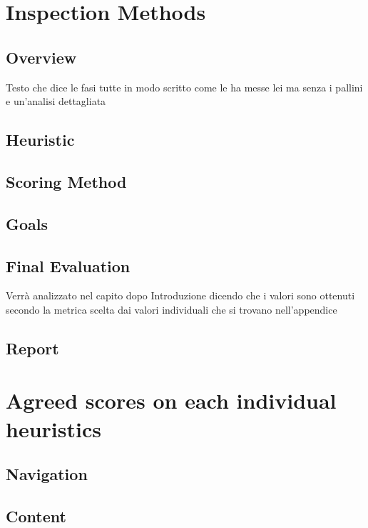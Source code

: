 \documentclass[a4paper,12pt]{report}
\begin{document}
	\chapter{Inspection Methods}
	\label{ch: Inspection Methods}

	\section{Overview}
	Testo che dice le fasi tutte in modo scritto come le ha messe lei ma senza i pallini e un’analisi dettagliata

	\section{Heuristic}

	\section{Scoring Method}

	\section{Goals}

	\section{Final Evaluation}
Verrà analizzato nel capito dopo
Introduzione dicendo che i valori sono ottenuti secondo la metrica scelta dai valori individuali che si trovano nell’appendice


	\section{Report}



	\chapter{Agreed scores on each individual heuristics}
	\label{ch: Agreed scores on each individual heuristics}

	\section{Navigation}

	\section{Content}
\end{document}
